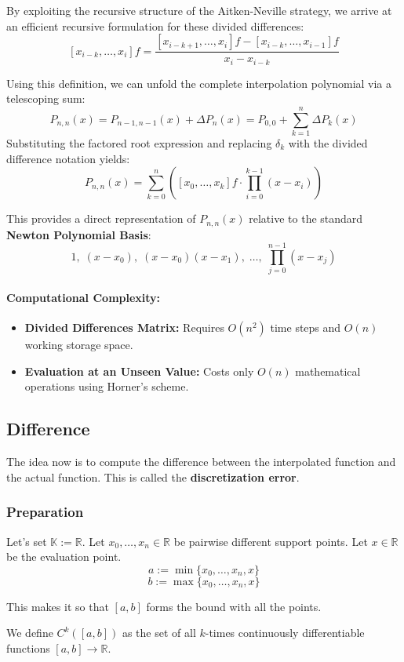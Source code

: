 \documentclass{article}
\begin{document}
By exploiting the recursive structure of the Aitken-Neville strategy, we arrive at an efficient recursive formulation for these divided differences:
\[[x_{i-k}, \dots, x_i]f = \frac{[x_{i-k+1}, \dots, x_i]f - [x_{i-k}, \dots, x_{i-1}]f}{x_i-x_{i-k}}\]

Using this definition, we can unfold the complete interpolation polynomial via a telescoping sum:
\[P_{n,n}(x) = P_{n-1,n-1}(x) + \Delta P_n(x) = P_{0,0} + \sum_{k=1}^{n}\Delta P_k(x)\]
Substituting the factored root expression and replacing $\delta_k$ with the divided difference notation yields:
\[P_{n,n}(x) = \sum_{k=0}^n \left( [x_0, \dots, x_k]f \cdot \prod_{i=0}^{k-1}(x-x_i) \right)\]

This provides a direct representation of $P_{n,n}(x)$ relative to the standard \textbf{Newton Polynomial Basis}:
\[1, \; (x-x_0), \; (x-x_0)(x-x_1), \; \dots, \; \prod_{j=0}^{n-1}(x-x_j)\]

\paragraph{Computational Complexity:}
\begin{itemize}
  \item \textbf{Divided Differences Matrix:} Requires $O(n^2)$ time steps and $O(n)$ working storage space.
  \item \textbf{Evaluation at an Unseen Value:} Costs only $O(n)$ mathematical operations using Horner's scheme.
\end{itemize}

\subsection{Difference}
The idea now is to compute the difference between the interpolated function and the actual function. This is called the \textbf{discretization error}.

\subsubsection{Preparation}
Let's set $\mathbb{K} := \mathbb{R}$. Let $x_0,\dots,x_n \in \mathbb{R}$ be pairwise different support points. Let $x\in \mathbb{R}$ be the evaluation point.
\[a := \min\{x_0,\dots,x_n,x\}\]
\[b := \max\{x_0,\dots,x_n,x\}\]

This makes it so that $[a,b]$ forms the bound with all the points.

We define $C^k([a,b])$ as the set of all $k$-times continuously differentiable functions $[a,b] \to \mathbb{R}$.
\end{document}
